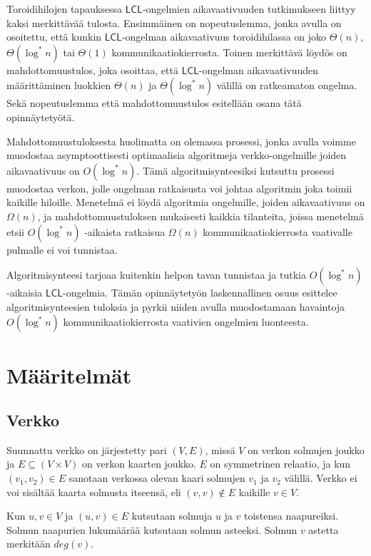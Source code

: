 \documentclass[12pt,finnish]{tktltiki2}
\theoremstyle{definition}
\theoremstyle{remark}
\newcommand*{\lcl}{\ensuremath{\mathsf{LCL}}}
\begin{document}
Toroidihilojen tapauksessa \lcl -ongelmien aikavaativuuden tutkimukseen liittyy kaksi merkittävää tulosta. Ensimmäinen on nopeutuslemma, jonka avulla on osoitettu, että kunkin \lcl -ongelman aikavaativuus toroidihilassa on joko $\Theta(n)$, $\Theta(\log^* n)$ tai $\Theta(1)$ kommunikaatiokierrosta. Toinen merkittävä löydös on mahdottomuustulos, joka osoittaa, että \lcl -ongelman aikavaativuuden määrittäminen luokkien $\Theta(n)$ ja $\Theta(\log^* n)$ välillä on ratkeamaton ongelma. Sekä nopeutuslemma että mahdottomuustulos esitellään osana tätä opinnäytetyötä.

Mahdottomuustuloksesta huolimatta on olemassa prosessi, jonka avulla voimme muodostaa asymptoottisesti optimaalisia algoritmeja verkko-ongelmille joiden aikavaativuus on $O(\log^* n)$. Tämä algoritmisynteesiksi kutsuttu prosessi muodostaa verkon, jolle ongelman ratkaisusta voi johtaa algoritmin joka toimii kaikille hiloille. Menetelmä ei löydä algoritmia ongelmille, joiden aikavaativuus on $\Omega(n)$, ja mahdottomuustuloksen mukaisesti kaikkia tilanteita, joissa menetelmä etsii $O(\log^* n)$ -aikaista ratkaisua $\Omega(n)$ kommunikaatiokierrosta vaativalle pulmalle ei voi tunnistaa.

Algoritmisynteesi tarjoaa kuitenkin helpon tavan tunnistaa ja tutkia $O(\log^* n)$-aikaisia \lcl -ongelmia. Tämän opinnäytetyön laskennallinen osuus esittelee algoritmisynteesien tuloksia ja pyrkii niiden avulla muodostamaan havaintoja $O(\log^* n)$ kommunikaatiokierrosta vaativien ongelmien luonteesta.

\section{Määritelmät}
\subsection{Verkko}


Suunnattu verkko on järjestetty pari $(V, E)$, missä $V$ on verkon solmujen joukko ja $E \subseteq (V \times V)$ on verkon kaarten joukko. $E$ on symmetrinen relaatio, ja kun $(v_1, v_2) \in E$ sanotaan verkossa olevan kaari solmujen $v_1$ ja $v_2$ välillä. Verkko ei voi sisältää kaarta solmusta itseensä, eli $(v, v) \notin E$ kaikille $v \in V$.

Kun $u, v \in V$ ja $(u, v) \in E$ kutsutaan solmuja $u$ ja $v$ toistensa naapureiksi. Solmun naapurien lukumäärää kutsutaan solmun asteeksi. Solmun $v$ astetta merkitään $deg(v)$.
\end{document}

